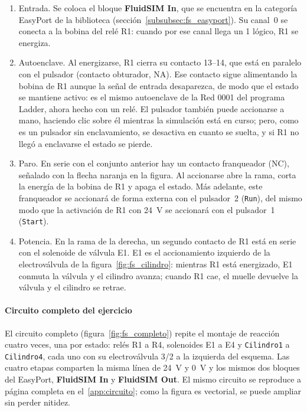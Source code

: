\documentclass[12pt,a4paper]{article}
\newcommand{\ui}[1]{\textcolor{DeepBlue}{\textsf{\textbf{#1}}}}
\begin{document}
\begin{enumerate}
    \item Entrada. Se coloca el bloque \ui{FluidSIM In}, que se encuentra
    en la categoría EasyPort de la biblioteca
    (sección~\ref{subsubsec:fs_easyport}). Su canal~0 se conecta a la bobina
    del relé R1: cuando por ese canal llega un 1 lógico, R1 se energiza.
    \item Autoenclave. Al energizarse, R1 cierra su contacto 13--14, que
    está en paralelo con el pulsador (contacto obturador, NA). Ese contacto
    sigue alimentando la bobina de R1 aunque la señal de entrada
    desaparezca, de modo que el estado se mantiene activo: es el mismo
    autoenclave de la Red 0001 del programa Ladder, ahora hecho con un relé.
    El pulsador también puede accionarse a mano, haciendo clic sobre él
    mientras la simulación está en curso; pero, como es un pulsador sin
    enclavamiento, se desactiva en cuanto se suelta, y si R1 no llegó a
    enclavarse el estado se pierde.
    \item Paro. En serie con el conjunto anterior hay un contacto
    franqueador (NC), señalado con la flecha naranja en la figura. Al
    accionarse abre la rama, corta la energía de la bobina de R1 y apaga el
    estado. Más adelante, este franqueador se accionará de forma externa
    con el pulsador~2 (\texttt{Run}), del mismo modo que la activación de
    R1 con 24~V se accionará con el pulsador~1 (\texttt{Start}).
    \item Potencia. En la rama de la derecha, un segundo contacto de R1
    está en serie con el solenoide de válvula E1. E1 es el accionamiento
    izquierdo de la electroválvula de la figura~\ref{fig:fs_cilindro}:
    mientras R1 está energizado, E1 conmuta la válvula y el cilindro
    avanza; cuando R1 cae, el muelle devuelve la válvula y el cilindro se
    retrae.
\end{enumerate}

\paragraph{Circuito completo del ejercicio}
El circuito completo (figura~\ref{fig:fs_completo}) repite el montaje de
reacción cuatro veces, una por estado: relés R1 a R4, solenoides E1 a E4 y
\texttt{Cilindro1} a \texttt{Cilindro4}, cada uno con su electroválvula
3/2 a la izquierda del esquema. Las cuatro etapas comparten la misma línea
de 24~V y 0~V y los mismos dos bloques del EasyPort, \ui{FluidSIM In} y
\ui{FluidSIM Out}. El mismo circuito se reproduce a página completa en
el~\ref{app:circuito}; como la figura es vectorial, se puede ampliar sin
perder nitidez.
\end{document}
